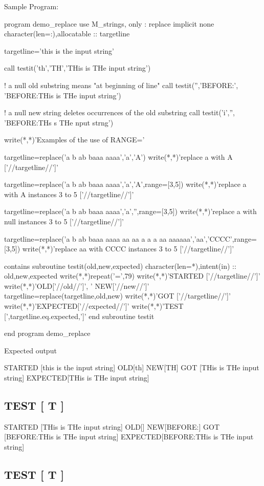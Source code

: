 Sample Program\+: \begin{DoxyVerb}program demo_replace
use M_strings, only : replace
implicit none
character(len=:),allocatable :: targetline

targetline='this is the input string'

call testit('th','TH','THis is THe input string')

! a null old substring means "at beginning of line"
call testit('','BEFORE:', 'BEFORE:THis is THe input string')

! a null new string deletes occurrences of the old substring
call testit('i','', 'BEFORE:THs s THe nput strng')

write(*,*)'Examples of the use of RANGE='

targetline=replace('a b ab baaa aaaa','a','A')
write(*,*)'replace a with A ['//targetline//']'

targetline=replace('a b ab baaa aaaa','a','A',range=[3,5])
write(*,*)'replace a with A instances 3 to 5 ['//targetline//']'

targetline=replace('a b ab baaa aaaa','a','',range=[3,5])
write(*,*)'replace a with null instances 3 to 5 ['//targetline//']'

targetline=replace('a b ab baaa aaaa aa aa a a a aa aaaaaa','aa','CCCC',range=[3,5])
write(*,*)'replace aa with CCCC instances 3 to 5 ['//targetline//']'

contains
subroutine testit(old,new,expected)
character(len=*),intent(in) :: old,new,expected
write(*,*)repeat('=',79)
write(*,*)'STARTED ['//targetline//']'
write(*,*)'OLD['//old//']', ' NEW['//new//']'
targetline=replace(targetline,old,new)
write(*,*)'GOT     ['//targetline//']'
write(*,*)'EXPECTED['//expected//']'
write(*,*)'TEST    [',targetline.eq.expected,']'
end subroutine testit

end program demo_replace
\end{DoxyVerb}


Expected output 

 S\+T\+A\+R\+T\+ED \mbox{[}this is the input string\mbox{]} O\+LD\mbox{[}th\mbox{]} N\+EW\mbox{[}TH\mbox{]} G\+OT \mbox{[}T\+His is T\+He input string\mbox{]} E\+X\+P\+E\+C\+T\+ED\mbox{[}T\+His is T\+He input string\mbox{]} \subsection*{T\+E\+ST \mbox{[} T \mbox{]} }

S\+T\+A\+R\+T\+ED \mbox{[}T\+His is T\+He input string\mbox{]} O\+LD\mbox{[}\mbox{]} N\+EW\mbox{[}B\+E\+F\+O\+RE\+:\mbox{]} G\+OT \mbox{[}B\+E\+F\+O\+RE\+:T\+His is T\+He input string\mbox{]} E\+X\+P\+E\+C\+T\+ED\mbox{[}B\+E\+F\+O\+RE\+:T\+His is T\+He input string\mbox{]} \subsection*{T\+E\+ST \mbox{[} T \mbox{]} }

